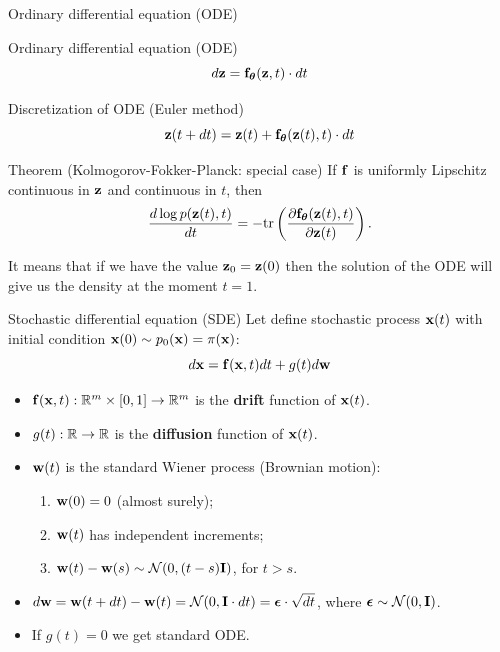 \begin{frame}{Ordinary differential equation (ODE)}
\begin{minipage}[t]{0.4\columnwidth}
\begin{figure}
		\end{figure}
	\end{minipage}
\end{frame}
\begin{frame}{Ordinary differential equation (ODE)}
	\[
 			d \mathbf{z} = \mathbf{f}_{\boldsymbol{\theta}}(\mathbf{z}, t) \cdot dt
	\]
	\vspace{-0.5cm}
	\begin{block}{Discretization of ODE (Euler method)}
		\vspace{-0.3cm}
		\[
			\mathbf{z}(t + dt) = \mathbf{z}(t) + \mathbf{f}_{\boldsymbol{\theta}}(\mathbf{z}(t), t) \cdot dt
		\]
		\vspace{-0.5cm}
	\end{block}
	\begin{block}{Theorem (Kolmogorov-Fokker-Planck: special case)}
		If $\mathbf{f}$ is uniformly Lipschitz continuous in $\mathbf{z}$ and continuous in $t$, then
		\[
			\frac{d \log p(\mathbf{z}(t), t)}{d t} = - \text{tr} \left( \frac{\partial \mathbf{f}_{\boldsymbol{\theta}}(\mathbf{z}(t), t)}{\partial \mathbf{z}(t)} \right).
		\]
	\end{block}
	It means that if we have the value $\mathbf{z}_0 = \mathbf{z}(0)$ then the solution of the ODE will give us the density at the moment $t=1$.
\end{frame}
\begin{frame}{Stochastic differential equation (SDE)}
	Let define stochastic process $\mathbf{x}(t)$ with initial condition $\mathbf{x}(0) \sim p_0(\mathbf{x}) = \pi(\mathbf{x})$:
	\[
		d\mathbf{x} = \mathbf{f}(\mathbf{x}, t) dt + g(t) d \mathbf{w}
	\]
	\vspace{-0.5cm}
	\begin{itemize}
		 \item $\mathbf{f}(\mathbf{x}, t): \mathbb{R}^m \times [0, 1] \rightarrow \mathbb{R}^m$ is the \textbf{drift} function of $\mathbf{x}(t)$.
		 \item $g(t): \mathbb{R} \rightarrow \mathbb{R}$ is the \textbf{diffusion} function of $\mathbf{x}(t)$.
		 \item $\mathbf{w}(t)$ is the standard Wiener process (Brownian motion):
		 \begin{enumerate}
		 	\item $\mathbf{w}(0) = 0$ (almost surely);
		 	\item $\mathbf{w}(t)$ has independent increments;
			 \item $\mathbf{w}(t) - \mathbf{w}(s) \sim \mathcal{N}(0, (t - s) \mathbf{I})$, for $t > s$.
		 \end{enumerate}
		 \item $d \mathbf{w} = \mathbf{w}(t + dt) - \mathbf{w}(t) = \mathcal{N}(0, \mathbf{I} \cdot dt ) = \boldsymbol{\epsilon} \cdot \sqrt{dt}$, where $\boldsymbol{\epsilon} \sim \mathcal{N}(0, \mathbf{I})$.
		 \item If $g(t) = 0$ we get standard ODE.
	\end{itemize}
\end{frame}
